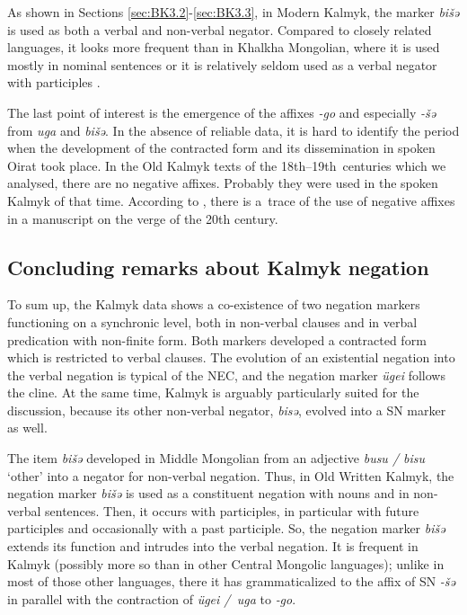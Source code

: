 \documentclass[output=paper]{langsci/langscibook}
\begin{document}
As shown in Sections \ref{sec:BK3.2}-\ref{sec:BK3.3}, in Modern Kalmyk, the marker \textit{bišǝ} is used as both a verbal and non-verbal negator. Compared to closely related languages, it looks more frequent than in Khalkha Mongolian, where it is used mostly in nominal sentences \citep[123-125]{yu1991a} or it is relatively seldom used as a verbal negator with participles \citep[251]{janhunen2012a}.

The last point of interest is the emergence of the affixes \textit{-go} and especially \textit{-šə} from \textit{uga} and \textit{bišə}. In the absence of reliable data, it is hard to identify the period when the development of the contracted form and its dissemination in spoken Oirat took place. In the Old Kalmyk texts of the 18th–19th centuries which we analysed, there are no negative affixes. Probably they were used in the spoken Kalmyk of that time. According to \citet[114]{bembeev2004a}, there is a trace of the use of negative affixes in a manuscript on the verge of the 20th century.


\subsection{Concluding remarks about Kalmyk negation}\label{sec:BK3.5}

To sum up, the Kalmyk data shows a co-existence of two negation markers functioning on a synchronic level, both in non-verbal clauses and in verbal predication with non-finite form. Both markers developed a contracted form which is restricted to verbal clauses. The evolution of an existential negation into the verbal negation is typical of the NEC, and the negation marker \textit{ügei} follows the cline. At the same time, Kalmyk is arguably particularly suited for the discussion, because its other non-verbal negator, \textit{bisə}, evolved into a SN marker as well.

The item \textit{bišǝ} developed in Middle Mongolian from an adjective \textit{busu / bisu} ‘other’ into a negator for non-verbal negation. Thus, in Old Written Kalmyk, the negation marker \textit{bišǝ} is used as a constituent negation with nouns and in non-verbal sentences. Then, it occurs with participles, in particular with future participles and occasionally with a past participle. So, the negation marker \textit{bišǝ} extends its function and intrudes into the verbal negation. It is frequent in Kalmyk (possibly more so than in other Central Mongolic languages); unlike in most of those other languages, there it has grammaticalized to the affix of SN \textit{-šǝ} in parallel with the contraction of \textit{ügei / uga} to \textit{‑go}.
\end{document}
